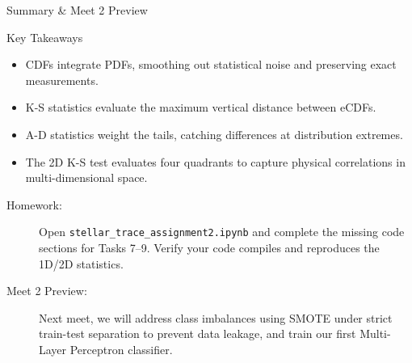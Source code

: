 \documentclass[9pt]{beamer}
\begin{document}
\begin{frame}{Summary \& Meet 2 Preview}
  \begin{block}{Key Takeaways}
    \begin{itemize}
      \item CDFs integrate PDFs, smoothing out statistical noise and preserving exact measurements.
      \item K-S statistics evaluate the maximum vertical distance between eCDFs.
      \item A-D statistics weight the tails, catching differences at distribution extremes.
      \item The 2D K-S test evaluates four quadrants to capture physical correlations in multi-dimensional space.
    \end{itemize}
  \end{block}
  \begin{description}
    \item[Homework:] Open \texttt{stellar\_trace\_assignment2.ipynb} and complete the missing code sections for Tasks 7--9. Verify your code compiles and reproduces the 1D/2D statistics.
    \item[Meet 2 Preview:] Next meet, we will address class imbalances using SMOTE under strict train-test separation to prevent data leakage, and train our first Multi-Layer Perceptron classifier.
  \end{description}
\end{frame}
\end{document}

